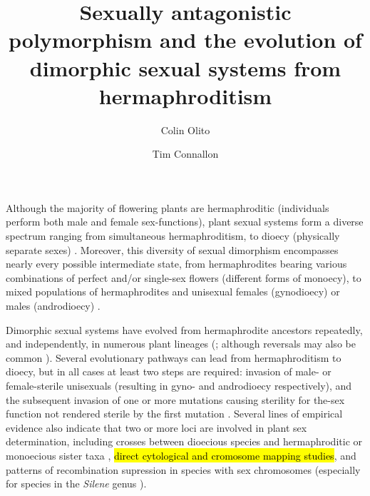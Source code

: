 \documentclass[9pt,twocolumn,twoside,lineno]{gsajnl}
\title{Sexually antagonistic polymorphism and the evolution of dimorphic sexual systems from hermaphroditism}
\author[$\ast$,1]{Colin Olito}
\author[$\ast$]{Tim Connallon}
\affil[$\ast$]{Department of Biological Sciences, Monash University, Melbourne, VIC 3800, Australia}
\begin{document}
\maketitle
\thispagestyle{firststyle}
\marginmark
\firstpagefootnote
{}
\vspace{-11pt}%

\lettrine[lines=2]{\color{color2}A}{}lthough the majority of flowering plants are hermaphroditic (individuals perform both male and female sex-functions), plant sexual systems form a diverse spectrum ranging from simultaneous hermaphroditism, to dioecy (physically separate sexes) \citep{Darwin1877,Westergaard1958,Bachtrog2014}. Moreover, this diversity of sexual dimorphism encompasses nearly every possible intermediate state, from hermaphrodites bearing various combinations of perfect and/or single-sex flowers (different forms of monoecy), to mixed populations of hermaphrodites and unisexual females (gynodioecy) or males (androdioecy) \citep{Bawa1980,SakaiWeller1999}.

Dimorphic sexual systems have evolved from hermaphrodite ancestors repeatedly, and independently, in numerous plant lineages (\citealt{Westergaard1958,SakaiWeller1999,Charlesworth2006,Bachtrog2014}; although reversals may also be common \citealt{GoldbergOtto2017}). Several evolutionary pathways can lead from hermaphroditism to dioecy, but in all cases at least two steps are required: invasion of male- or female-sterile unisexuals (resulting in gyno- and androdioecy respectively), and the subsequent invasion of one or more mutations causing sterility for the-sex function not rendered sterile by the first mutation \citep{Westergaard1958,Charlesworth1978a,Charlesworth1978b,Charlesworth2006,Charlesworth2009}. Several lines of empirical evidence also indicate that two or more loci are involved in plant sex determination, including crosses between dioecious species and hermaphroditic or monoecious sister taxa \citep{Westergaard1958}, \hl{direct cytological and cromosome mapping studies}, and patterns of recombination supression in species with sex chromosomes (especially for species in the \textit{Silene} genus \citealt{Charlesworth2002,Charlesworth2006}). 
\end{document}
